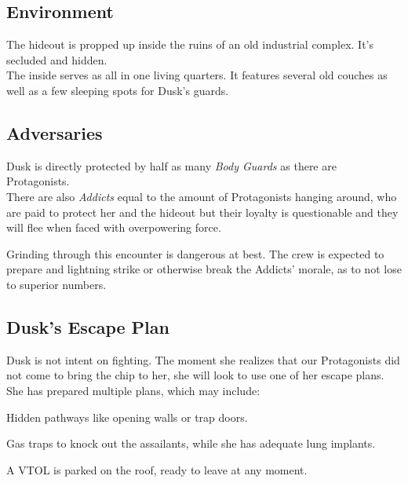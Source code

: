 \subsection*{Environment}
The hideout is propped up inside the ruins of an old industrial complex.
It's secluded and hidden.
\\%
The inside serves as all in one living quarters.
It features several old couches
	as well as a few sleeping spots for Dusk's guards.

\subsection*{Adversaries}
Dusk is directly protected by 
	half as many 
	\emph{Body Guards}
	as there are Protagonists.
	\\%
There are also
	\emph{Addicts}
	equal to the amount of Protagonists
	hanging around, who are paid to protect her and the hideout
	but their loyalty is questionable and they will flee when faced with overpowering force.
	\\%
\begin{exampleblock}
	Grinding through this encounter is dangerous at best.
	The crew is expected to prepare
		and lightning strike
		or otherwise break the Addicts' morale,
		as to not lose to superior numbers.
\end{exampleblock}

\subsection*{Dusk's Escape Plan}
Dusk is not intent on fighting.
The moment she realizes that our Protagonists did not come to bring the chip to her,
	she will look to use one of her escape plans.
She has prepared multiple plans, which may include:
\begin{sitemize}
	\item Hidden pathways like opening walls or trap doors.
	\item Gas traps to knock out the assailants,
		while she has adequate lung implants.
	\item A VTOL is parked on the roof, ready to leave at any moment.
\end{sitemize}
